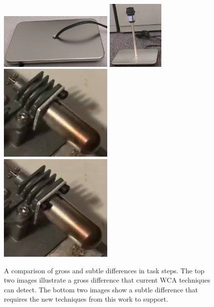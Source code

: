 \begin{figure}
  \includegraphics[width=0.5\textwidth]{figures/coarse_fine/lamp_base.png}
  \includegraphics[width=0.25\textwidth]{figures/coarse_fine/lamp_pipe.png}
  \includegraphics[width=0.5\textwidth]{figures/coarse_fine/stirling_1screw.png}
  \includegraphics[width=0.5\textwidth]{figures/coarse_fine/stirling_2screws.png}
  \caption[A comparison of gross and subtle differences in task steps]{
    A comparison of gross and subtle differences in task steps.
    The top two images illustrate a gross difference that current WCA techniques
    can detect.
    The bottom two images show a subtle difference that requires the new
    techniques from this work to support.
  }\label{fig:subtle_gross}
  \vspace{-0.2in}
\end{figure}

